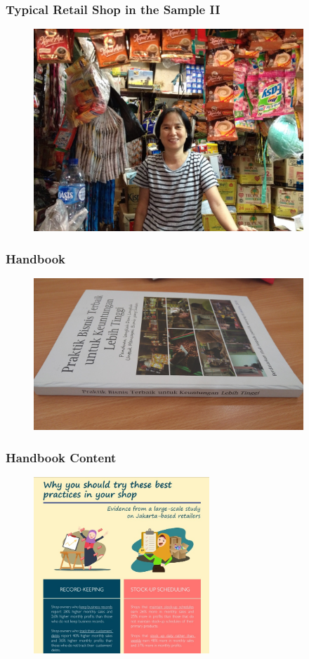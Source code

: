 \documentclass[10pt]{beamer}
\begin{document}
\begin{frame}
\frametitle{Typical Retail Shop in the Sample II}

\begin{figure}[htbp]
	\centering
		\includegraphics[width=4in]{pics/retailer2.jpg}
	\label{height}
\end{figure}
\end{frame}


\begin{frame}
\frametitle{Handbook}

\begin{figure}[htbp]
	\centering
		\includegraphics[width=4in]{pics/handbook.jpg}
	
	\label{height}
\end{figure}
\end{frame}


\begin{frame}
\frametitle{Handbook Content}
\begin{figure}[htbp]
	\centering
		\includegraphics[width=2.6in]{pics/Handbook_return.jpg}
	
	\label{height}
\end{figure}
\end{frame}
\end{document}
